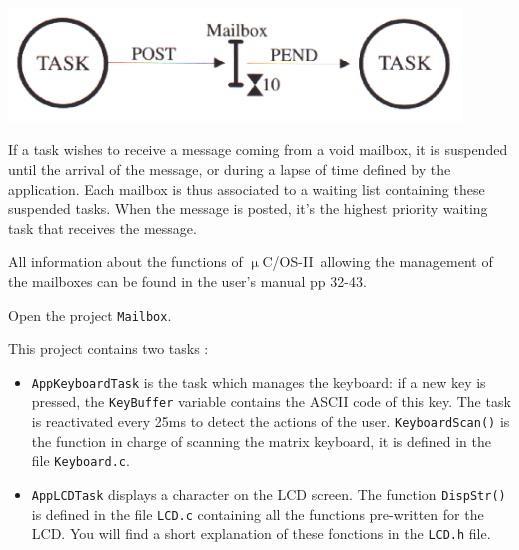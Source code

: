 \documentclass[10pt,a4paper]{article}
\theoremstyle{definition}%
\newcommand{\uCOSII}{$\upmu$C/OS-II}
\newcommand{\kw}[1]{\texttt{#1}}
\begin{document}
\begin{center}
\includegraphics[width=12cm]{mailbox.png}
\end{center}

If a task wishes to receive a message coming from a void mailbox, it is suspended until the arrival of
the message, or during a lapse of time defined by the application. Each mailbox is thus associated to
a waiting list containing these suspended tasks. When the message is posted, it's the highest priority
waiting task that receives the message.

All information about the functions of \uCOSII~allowing the management of the mailboxes can be
found in the user's manual pp 32-43.

 Open the project \kw{Mailbox}.
 
This project contains two tasks :
\begin{itemize}
\item \kw{AppKeyboardTask} is the task which manages the keyboard: if a new key is pressed, the
\kw{KeyBuffer} variable contains the ASCII code of this key. The task is reactivated every 25ms to
detect the actions of the user. \kw{KeyboardScan()} is the function in charge of scanning the matrix
keyboard, it is defined in the file \kw{Keyboard.c}.
\item \kw{AppLCDTask} displays a character on the LCD screen. The function \kw{DispStr()} is defined in the
file \kw{LCD.c} containing all the functions pre-written for the LCD. You will find a short explanation
of these fonctions in the \kw{LCD.h} file.
\end{itemize}

\end{document}
